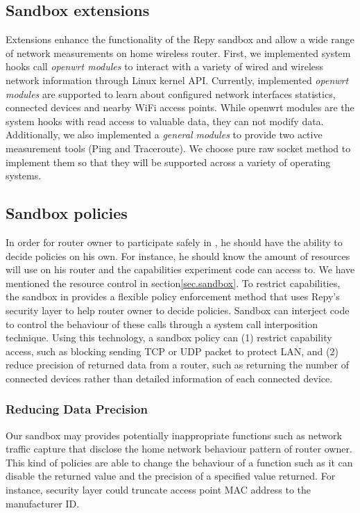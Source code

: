 \subsection{Sandbox extensions}
\label{sec.extensions}
Extensions enhance the functionality of the Repy sandbox and allow a wide range of network measurements on home wireless router. First, we implemented system hooks call \textit{openwrt modules} to interact with a variety of wired and wireless network information through Linux kernel API. Currently, implemented \textit{openwrt modules} are supported to learn about configured network interfaces statistics, connected devices and nearby WiFi access points. While openwrt modules are the system hooks with read access to valuable data, they can not modify data. Additionally, we also implemented a \textit{general modules} to provide two active measurement tools (Ping and Traceroute). We choose pure raw socket method to implement them so that they will be supported across a variety of operating systems. 

\subsection{Sandbox policies}
\label{sec.policy}
In order for router owner to participate safely in \sysname, he should have the ability to decide policies on his own. For instance, he should know the amount of resources \sysname will use on his router and the capabilities experiment code can access to. We have mentioned the resource control in section\ref{sec.sandbox}. To restrict capabilities, the sandbox in \sysname provides a flexible policy enforcement method that uses Repy's security layer to help router owner to decide policies. Sandbox can interject code to control the behaviour of these calls through a system call interposition technique. Using this technology, a sandbox policy can (1) restrict capability access, such as blocking sending TCP or UDP packet to protect LAN, and (2) reduce precision of returned data from a router, such as returning the number of connected devices rather than detailed information of each connected device.

\subsubsection{Reducing Data Precision}
Our sandbox may provides potentially inappropriate functions such as network traffic capture that disclose the home network behaviour pattern of router owner. This kind of policies are able to change the behaviour of a function such as it can disable the returned value and the precision of a specified value returned. For instance, security layer could truncate access point MAC address to the manufacturer ID.

